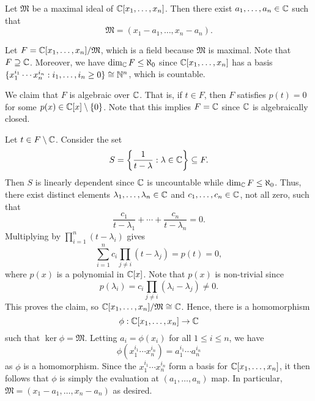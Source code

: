 \begin{theo}[Nullstellensatz]{}
Let $\mathfrak{M}$ be a maximal ideal of $\mathbb{C}[x_1, \dots, x_n]$. Then there exist 
$a_1, \dots, a_n \in \mathbb{C}$ such that 
\[ \mathfrak M = (x_1-a_1, \dots, x_n-a_n). \]
\end{theo}
\begin{pf}
Let $F = \mathbb{C}[x_1, \dots, x_n]/\mathfrak M$, which is a field because $\mathfrak M$ is maximal. 
Note that $F \supseteq \mathbb{C}$. Moreover, we have $\dim_{\mathbb{C}} F \leq \aleph_0$ since 
$\mathbb{C}[x_1, \dots, x_n]$ has a basis $\{x_1^{i_1} \cdots x_n^{i_n} : i_1, \dots, i_n \geq 0\} 
\cong \mathbb{N}^n$, which is countable. 

We claim that $F$ is algebraic over $\mathbb{C}$. That is, if $t \in F$, then $F$ satisfies $p(t) = 0$ 
for some $p(x) \in \mathbb{C}[x] \setminus \{0\}$. Note that this implies $F = \mathbb{C}$ since $\mathbb{C}$ is 
algebraically closed. 

Let $t \in F \setminus \mathbb{C}$. Consider the set 
\[ S = \left\{ \frac1{t-\lambda} : \lambda \in \mathbb{C}\right\} \subseteq F. \] 
Then $S$ is linearly dependent since $\mathbb{C}$ is uncountable while $\dim_{\mathbb{C}} F \leq \aleph_0$. 
Thus, there exist distinct elements $\lambda_1, \dots, \lambda_n \in \mathbb{C}$ and $c_1, \dots, c_n 
\in \mathbb{C}$, not all zero, such that 
\[ \frac{c_1}{t - \lambda_1} + \cdots + \frac{c_n}{t - \lambda_n} = 0. \]
Multiplying by $\prod_{i=1}^n (t - \lambda_i)$ gives 
\[ \sum_{i=1}^n c_i \prod_{j\neq i} (t - \lambda_j) = p(t) = 0, \]
where $p(x)$ is a polynomial in $\mathbb{C}[x]$. Note that $p(x)$ is non-trivial since 
\[ p(\lambda_i) = c_i \prod_{j\neq i} (\lambda_i - \lambda_j) \neq 0. \]
This proves the claim, so $\mathbb{C}[x_1, \dots, x_n]/\mathfrak M \cong \mathbb{C}$. Hence, there is a homomorphism 
\[ \phi : \mathbb{C}[x_1, \dots, x_n] \to \mathbb{C} \] 
such that $\ker\phi = \mathfrak M$. Letting $a_i = \phi(x_i)$ for all $1 \leq i \leq n$, we have 
\[ \phi(x_1^{i_1} \cdots x_n^{i_n}) = a_1^{i_1} \cdots a_n^{i_n} \]
as $\phi$ is a homomorphism. Since the $x_1^{i_1} \cdots x_n^{i_n}$ form a basis for 
$\mathbb{C}[x_1, \dots, x_n]$, it then follows that $\phi$ is simply the evaluation at 
$(a_1, \dots, a_n)$ map. In particular, $\mathfrak M = (x_1 - a_1, \dots, x_n - a_n)$ as desired.
\end{pf}

